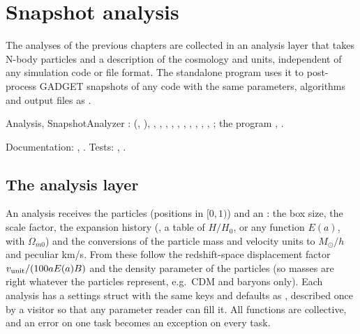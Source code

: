 \chapter{Snapshot analysis}\label{ch:snapshot-analyzer}

The analyses of the previous chapters are collected in an analysis layer that takes N-body particles and a description of the
cosmology and units, independent of any simulation code or file format. The standalone program  uses it to
post-process GADGET snapshots of any code with the same parameters, algorithms and output files as .

\begin{modulebox}{Analysis, SnapshotAnalyzer}
:  (, ), , ,
, , , , , , ,
, ; the program , .\par
Documentation: , . Tests: , .
\end{modulebox}

\section{The analysis layer}\label{sec:sa-layer}

An analysis receives the particles (positions in $[0,1)$) and an : the box size, the scale factor, the expansion history
(, a table of $H/H_0$, or any function $E(a)$, with $\Omega_{m0}$) and the conversions of the particle mass and velocity units to
$M_\odot/h$ and peculiar km/s. From these follow the redshift-space displacement factor $v_{\rm unit}/(100aE(a)B)$ and the density parameter of the
particles (so  masses are right whatever the particles represent, e.g.\ CDM and baryons only). Each analysis has a settings struct with the same
keys and defaults as , described once by a  visitor so that any parameter reader can fill it. All functions are
collective, and an error on one task becomes an exception on every task.

